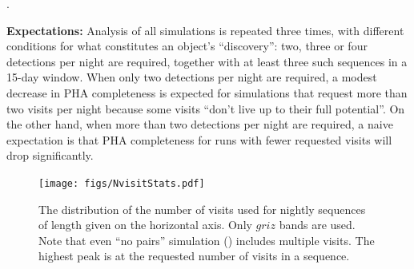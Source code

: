 


.






{\bf Expectations:}  Analysis of all simulations is repeated three
times, with different conditions for what constitutes an object's
``discovery'':  two, three or four detections per night are required,
together with at least three such sequences in a 15-day window.  When
only two detections per night are required, a modest decrease in PHA
completeness is expected for simulations that request more than two
visits per night because some visits ``don't live up to their full
potential''. On the other hand, when more than two detections per
night are required, a naive expectation is that PHA completeness for
runs with fewer requested visits will drop significantly. \\

\begin{figure}[t!]
\vskip -2.5in
\texttt{[image: figs/NvisitStats.pdf]}
\vskip -2.7in
\caption{The distribution of the number of visits used for nightly sequences of
length given on the horizontal axis. Only $griz$ bands are used. Note that even
``no pairs'' simulation ()
includes multiple visits. The highest peak is at the
requested number of visits in a sequence.}
\label{fig:NvisitStats}
\end{figure}

